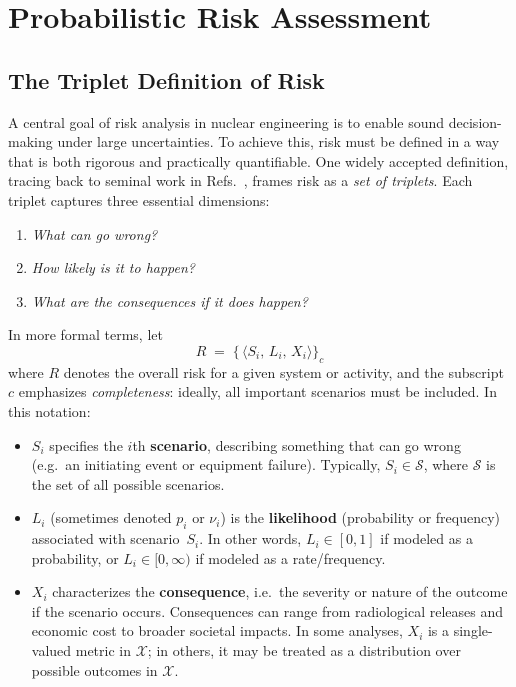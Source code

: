 \chapter{Probabilistic Risk Assessment}

\section{The Triplet Definition of Risk}
\label{sec:triplet_definition_of_risk}
A central goal of risk analysis in nuclear engineering is to enable sound decision-making under large uncertainties. To achieve this, risk must be defined in a way that is both rigorous and practically quantifiable. One widely accepted definition, tracing back to seminal work in Refs.~\cite{kaplan_quantitative_1981}, frames risk as a \emph{set of triplets}. Each triplet captures three essential dimensions:

\begin{enumerate}
  \item \textit{What can go wrong?}
  \item \textit{How likely is it to happen?}
  \item \textit{What are the consequences if it does happen?}
\end{enumerate}

In more formal terms, let
\begin{equation}
\label{eq:risk_triplets}
    R \;=\;
    \bigl\{\,
        \langle
            S_i,\,
            L_i,\,
            X_i
        \rangle
    \bigr\}_{c}
\end{equation}
where \(R\) denotes the overall risk for a given system or activity, and the subscript \(c\) emphasizes \emph{completeness}: ideally, all important scenarios must be included. In this notation:
\begin{itemize}
    \item \(S_i\) specifies the \(i\)th \textbf{scenario}, describing something that can go wrong (e.g.\ an initiating event or equipment failure).  Typically, \(S_i \in \mathcal{S}\), where \(\mathcal{S}\) is the set of all possible scenarios.
    \item \(L_i\) (sometimes denoted \(p_i\) or \(\nu_i\)) is the \textbf{likelihood} (probability or frequency) associated with scenario~\(S_i\).  In other words, \(L_i\in [0,1]\) if modeled as a probability, or \(L_i\in [0,\infty)\) if modeled as a rate/frequency.
    \item \(X_i\) characterizes the \textbf{consequence}, i.e.\ the severity or nature of the outcome if the scenario occurs. Consequences can range from radiological releases and economic cost to broader societal impacts. In some analyses, \(X_i\) is a single-valued metric in \(\mathcal{X}\); in others, it may be treated as a distribution over possible outcomes in \(\mathcal{X}\).
\end{itemize}


